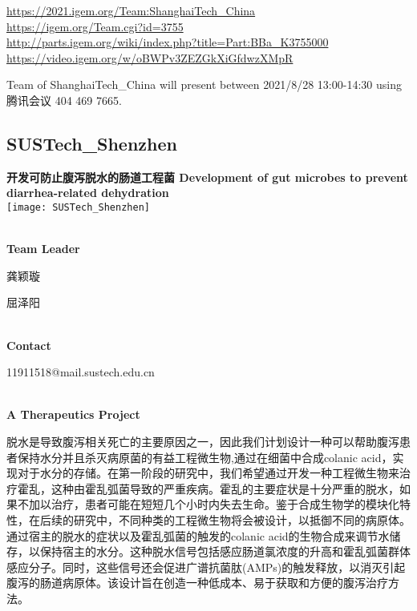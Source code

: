 \url{https://2021.igem.org/Team:ShanghaiTech\_China }\\
\url{https://igem.org/Team.cgi?id=3755 }\\
\url{http://parts.igem.org/wiki/index.php?title=Part:BBa_K3755000 }\\
\url{https://video.igem.org/w/oBWPv3ZEZGkXiGfdwzXMpR }\\

\vfill{}









Team of ShanghaiTech\_China will present between      2021/8/28 13:00-14:30   using 腾讯会议 404 469 7665.
\newpage


\subsection{\textcolor{Blu}{ SUSTech\_Shenzhen } }
\vspace{5mm}
\begin{center}
\large{
  \textbf{ 开发可防止腹泻脱水的肠道工程菌 Development of gut microbes to prevent diarrhea-related dehydration }\\

  \texttt{[image: SUSTech\_Shenzhen]}
}
\end{center}
\textbf{\\Team Leader}

  龚颖璇

  屈泽阳


\textbf{\\Contact}

  11911518@mail.sustech.edu.cn


\textbf{\\A Therapeutics Project\\}\begin{spacing}{1.5}

脱水是导致腹泻相关死亡的主要原因之一，因此我们计划设计一种可以帮助腹泻患者保持水分并且杀灭病原菌的有益工程微生物,通过在细菌中合成colanic acid，实现对于水分的存储。在第一阶段的研究中，我们希望通过开发一种工程微生物来治疗霍乱，这种由霍乱弧菌导致的严重疾病。霍乱的主要症状是十分严重的脱水，如果不加以治疗，患者可能在短短几个小时内失去生命。鉴于合成生物学的模块化特性，在后续的研究中，不同种类的工程微生物将会被设计，以抵御不同的病原体。通过宿主的脱水的症状以及霍乱弧菌的触发的colanic acid的生物合成来调节水储存，以保持宿主的水分。这种脱水信号包括感应肠道氯浓度的升高和霍乱弧菌群体感应分子。同时，这些信号还会促进广谱抗菌肽(AMPs)的触发释放，以消灭引起腹泻的肠道病原体。该设计旨在创造一种低成本、易于获取和方便的腹泻治疗方法。\end{spacing}
\\

